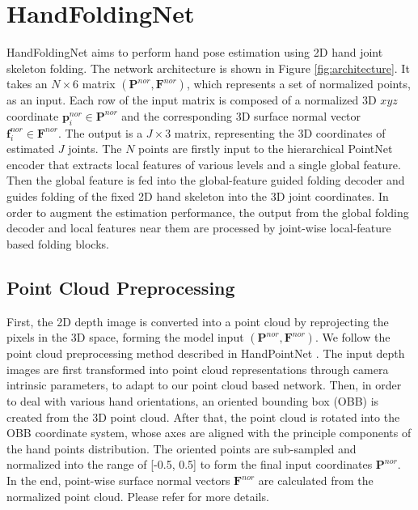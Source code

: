 \documentclass[10pt,twocolumn,letterpaper]{article}
\begin{document}
\section{HandFoldingNet}



HandFoldingNet aims to perform hand pose estimation using 2D hand joint skeleton folding. The network architecture is shown in Figure \ref{fig:architecture}. It takes an $N \times 6$ matrix $(\mathbf{P}^{nor},\mathbf{F}^{nor})$, which represents a set of normalized points, as an input. Each row of the input matrix is composed of a normalized 3D $xyz$ coordinate $\textbf{p}_i^{nor} \in \textbf{P}^{nor}$ and the corresponding 3D surface normal vector $\textbf{f}_i^{nor} \in \textbf{F}^{nor}$. The output is a $J \times 3$ matrix, representing the 3D coordinates of estimated $J$ joints. The $N$ points are firstly input to the hierarchical PointNet encoder that extracts local features of various levels and a single global feature. Then the global feature is fed into the global-feature guided folding decoder and guides folding of the fixed 2D hand skeleton into the 3D joint coordinates. In order to augment the estimation performance, the output from the global folding decoder and local features near them are processed by joint-wise local-feature based folding blocks.

\subsection{Point Cloud Preprocessing}
First, the 2D depth image is converted into a point cloud by reprojecting the pixels in the 3D space, forming the model input $(\mathbf{P}^{nor},\mathbf{F}^{nor})$.
We follow the point cloud preprocessing method described in HandPointNet \cite{ge2018hand}. The input depth images are first transformed into point cloud representations through camera intrinsic parameters, to adapt to our point cloud based network. Then, in order to deal with various hand orientations, an oriented bounding box (OBB) is created from the 3D point cloud. After that, the point cloud is rotated into the OBB coordinate system, whose axes are aligned with the principle components of the hand points distribution. The oriented points are sub-sampled and normalized into the range of [-0.5, 0.5] to form the final input coordinates $\mathbf{P}^{nor}$. In the end, point-wise surface normal vectors $\mathbf{F}^{nor}$ are calculated from the normalized point cloud. Please refer \cite{ge2018hand} for more details.
\end{document}
